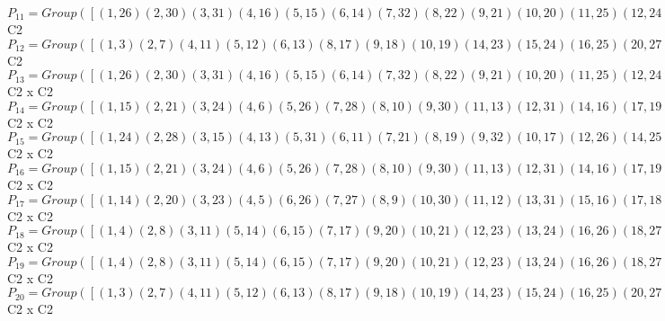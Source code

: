 \documentclass[varwidth=\maxdimen,border=10]{standalone}
\begin{document}
\begin{tabular}
$P_{11} = Group( [ ( 1,26)( 2,30)( 3,31)( 4,16)( 5,15)( 6,14)( 7,32)( 8,22)( 9,21)(10,20)(11,25)(12,24)(13,23)(17,29)(18,28)(19,27) ] )\cong$ C2\ \\
$P_{12} = Group( [ ( 1, 3)( 2, 7)( 4,11)( 5,12)( 6,13)( 8,17)( 9,18)(10,19)(14,23)(15,24)(16,25)(20,27)(21,28)(22,29)(26,31)(30,32) ] )\cong$ C2\ \\
$P_{13} = Group( [ ( 1,26)( 2,30)( 3,31)( 4,16)( 5,15)( 6,14)( 7,32)( 8,22)( 9,21)(10,20)(11,25)(12,24)(13,23)(17,29)(18,28)(19,27), ( 1,13)( 2,19)( 3, 6)( 4,24)( 5,25)( 7,10)( 8,28)( 9,29)(11,15)(12,16)(14,31)(17,21)(18,22)(20,32)(23,26)(27,30) ] )\cong$ C2 x C2\ \\
$P_{14} = Group( [ ( 1,15)( 2,21)( 3,24)( 4, 6)( 5,26)( 7,28)( 8,10)( 9,30)(11,13)(12,31)(14,16)(17,19)(18,32)(20,22)(23,25)(27,29), ( 1, 5)( 2, 9)( 3,12)( 4,14)( 6,16)( 7,18)( 8,20)(10,22)(11,23)(13,25)(15,26)(17,27)(19,29)(21,30)(24,31)(28,32) ] )\cong$ C2 x C2\ \\
$P_{15} = Group( [ ( 1,24)( 2,28)( 3,15)( 4,13)( 5,31)( 6,11)( 7,21)( 8,19)( 9,32)(10,17)(12,26)(14,25)(16,23)(18,30)(20,29)(22,27), ( 1, 5)( 2, 9)( 3,12)( 4,14)( 6,16)( 7,18)( 8,20)(10,22)(11,23)(13,25)(15,26)(17,27)(19,29)(21,30)(24,31)(28,32) ] )\cong$ C2 x C2\ \\
$P_{16} = Group( [ ( 1,15)( 2,21)( 3,24)( 4, 6)( 5,26)( 7,28)( 8,10)( 9,30)(11,13)(12,31)(14,16)(17,19)(18,32)(20,22)(23,25)(27,29), ( 1,16)( 2,22)( 3,25)( 4,26)( 5, 6)( 7,29)( 8,30)( 9,10)(11,31)(12,13)(14,15)(17,32)(18,19)(20,21)(23,24)(27,28) ] )\cong$ C2 x C2\ \\
$P_{17} = Group( [ ( 1,14)( 2,20)( 3,23)( 4, 5)( 6,26)( 7,27)( 8, 9)(10,30)(11,12)(13,31)(15,16)(17,18)(19,32)(21,22)(24,25)(28,29), ( 1, 6)( 2,10)( 3,13)( 4,15)( 5,16)( 7,19)( 8,21)( 9,22)(11,24)(12,25)(14,26)(17,28)(18,29)(20,30)(23,31)(27,32) ] )\cong$ C2 x C2\ \\
$P_{18} = Group( [ ( 1, 4)( 2, 8)( 3,11)( 5,14)( 6,15)( 7,17)( 9,20)(10,21)(12,23)(13,24)(16,26)(18,27)(19,28)(22,30)(25,31)(29,32), ( 1, 6)( 2,10)( 3,13)( 4,15)( 5,16)( 7,19)( 8,21)( 9,22)(11,24)(12,25)(14,26)(17,28)(18,29)(20,30)(23,31)(27,32) ] )\cong$ C2 x C2\ \\
$P_{19} = Group( [ ( 1, 4)( 2, 8)( 3,11)( 5,14)( 6,15)( 7,17)( 9,20)(10,21)(12,23)(13,24)(16,26)(18,27)(19,28)(22,30)(25,31)(29,32), ( 1, 5)( 2, 9)( 3,12)( 4,14)( 6,16)( 7,18)( 8,20)(10,22)(11,23)(13,25)(15,26)(17,27)(19,29)(21,30)(24,31)(28,32) ] )\cong$ C2 x C2\ \\
$P_{20} = Group( [ ( 1, 3)( 2, 7)( 4,11)( 5,12)( 6,13)( 8,17)( 9,18)(10,19)(14,23)(15,24)(16,25)(20,27)(21,28)(22,29)(26,31)(30,32), ( 1, 6)( 2,10)( 3,13)( 4,15)( 5,16)( 7,19)( 8,21)( 9,22)(11,24)(12,25)(14,26)(17,28)(18,29)(20,30)(23,31)(27,32) ] )\cong$ C2 x C2\ \\

\end{tabular}
\end{document}
